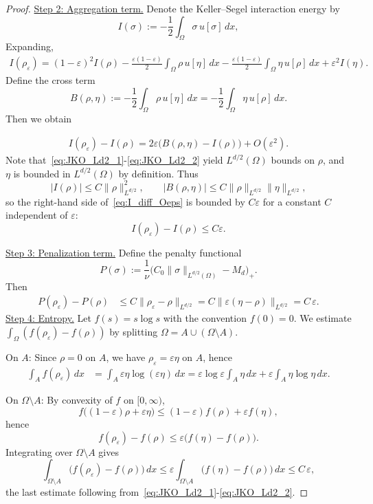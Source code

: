 \documentclass[10pt,a4paper]{amsart}
\begin{document}
\begin{proof}
\medskip
\underline{Step 2: Aggregation term.}
Denote the Keller--Segel interaction energy by
\[
I(\sigma):=-\frac12\int_\Omega \sigma\,u[\sigma]\,dx,
\]
Expanding,
\begin{align*}
I(\rho_\varepsilon)=(1-\varepsilon)^2 I(\rho)
-\frac{\varepsilon(1-\varepsilon)}2\int_\Omega \rho\,u[\eta]\,dx
-\frac{\varepsilon(1-\varepsilon)}2\int_\Omega \eta\,u[\rho]\,dx
+\varepsilon^2 I(\eta).
\end{align*}
Define the cross term
\[
B(\rho,\eta):=-\frac12\int_\Omega \rho\,u[\eta]\,dx=-\frac12\int_\Omega \eta\,u[\rho]\,dx.
\]
Then we obtain

\begin{align}
I(\rho_\varepsilon)-I(\rho)=2\varepsilon\bigl(B(\rho,\eta)-I(\rho)\bigr)+O(\varepsilon^2).\label{eq:I_diff_Oeps}
\end{align}
Note that~\eqref{eq:JKO_Ld2_1}-\eqref{eq:JKO_Ld2_2} yield $L^{d/2}(\Omega)$ bounds on $\rho$, and $\eta$ is bounded in $L^{d/2}(\Omega)$ by definition. Thus
\[
|I(\rho)|\le C\|\rho\|_{L^{d/2}}^2,\qquad |B(\rho,\eta)|\le C\|\rho\|_{L^{d/2}}\|\eta\|_{L^{d/2}},
\]
so the right-hand side of~\eqref{eq:I_diff_Oeps} is bounded by $C\varepsilon$ for a constant $C$ independent of $\varepsilon$:
\begin{equation}\label{eq:I_Oeps}
I(\rho_\varepsilon)-I(\rho)\le C\varepsilon.
\end{equation}

\medskip
\underline{Step 3: Penalization term.}
Define the penalty functional
\[
P(\sigma):=\frac{1}{\nu}\bigl(C_0\|\sigma\|_{L^{d/2}(\Omega)}-M_d\bigr)_+.
\]
Then
\begin{align}
P(\rho_\varepsilon)-P(\rho)
&\le C\|\rho_\varepsilon-\rho\|_{L^{d/2}}
= C\|\varepsilon(\eta-\rho)\|_{L^{d/2}}
= C\,\varepsilon.
\label{eq:penalty_Oeps}
\end{align}
\medskip
\underline{Step 4: Entropy.}
Let $f(s)=s\log s$ with the convention $f(0)=0$.
We estimate $\int_\Omega (f(\rho_\varepsilon)-f(\rho))$ by splitting $\Omega=A\cup(\Omega\setminus A)$.

\smallskip
On $A$:
Since $\rho=0$ on $A$, we have $\rho_\varepsilon=\varepsilon\eta$ on $A$, hence
\begin{align}
\int_A f(\rho_\varepsilon)\,dx
&=\int_A \varepsilon\eta\log(\varepsilon\eta)\,dx
=\varepsilon\log\varepsilon\int_A \eta\,dx+\varepsilon\int_A \eta\log\eta\,dx.
\label{eq:entropy_on_A}
\end{align}

On $\Omega\setminus A$:
By convexity of $f$ on $[0,\infty)$,
\[
f\bigl((1-\varepsilon)\rho+\varepsilon\eta\bigr)\le (1-\varepsilon)f(\rho)+\varepsilon f(\eta),
\]
hence
\[
f(\rho_\varepsilon)-f(\rho)\le \varepsilon\bigl(f(\eta)-f(\rho)\bigr).
\]
Integrating over $\Omega\setminus A$ gives
\begin{equation}\label{eq:entropy_off_A}
\int_{\Omega\setminus A}\bigl(f(\rho_\varepsilon)-f(\rho)\bigr)\,dx
\le \varepsilon\int_{\Omega\setminus A}\bigl(f(\eta)-f(\rho)\bigr)\,dx
\le C\,\varepsilon,
\end{equation}
the last estimate following from~\eqref{eq:JKO_Ld2_1}-\eqref{eq:JKO_Ld2_2}.


\end{proof}
\end{document}
